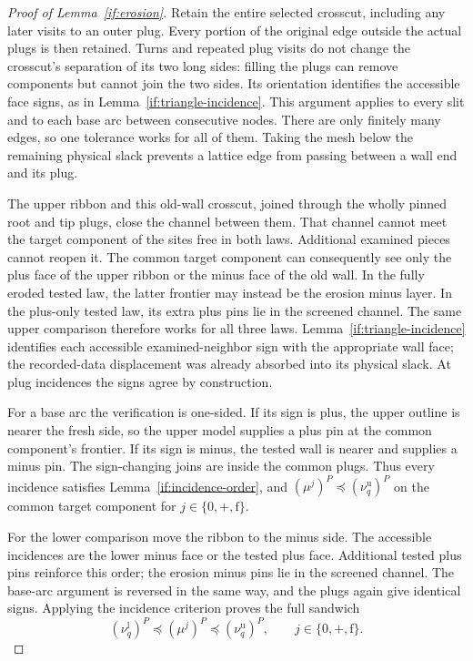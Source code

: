 \documentclass[11pt]{article}
\theoremstyle{definition}
\theoremstyle{remark}
\numberwithin{equation}{section}
\begin{document}
\begin{proof}[Proof of Lemma~\ref{if:erosion}]
Retain the entire selected crosscut, including any later visits to
an outer plug. Every portion of the original edge outside the actual
plugs is then retained. Turns and repeated plug visits do not change
the crosscut's separation of its two long sides: filling the plugs
can remove components but cannot join the two sides. Its orientation
identifies the accessible face signs, as in
Lemma~\ref{if:triangle-incidence}. This argument applies to every
slit and to each base arc between consecutive nodes. There are only
finitely many edges, so one tolerance works for all of them. Taking
the mesh below the remaining physical slack prevents a lattice edge
from passing between a wall end and its plug.

The upper ribbon and this old-wall crosscut, joined through the
wholly pinned root and tip plugs, close the channel between them.
That channel cannot meet the target component of the sites free in
both laws. Additional examined pieces cannot reopen it. The common
target component can consequently see only the plus face of the
upper ribbon or the minus face of the old wall. In the fully eroded
tested law, the latter frontier may instead be the erosion minus
layer. In the plus-only tested law, its extra plus pins lie in the
screened channel. The same upper comparison therefore works for
all three laws. Lemma~\ref{if:triangle-incidence} identifies each
accessible examined-neighbor sign with the appropriate wall face;
the recorded-data displacement was already absorbed into its
physical slack. At plug incidences the signs agree by construction.

For a base arc the verification is one-sided. If its sign is plus,
the upper outline is nearer the fresh side, so the upper model
supplies a plus pin at the common component's frontier. If its sign
is minus, the tested wall is nearer and supplies a minus pin. The
sign-changing joins are inside the common plugs. Thus every
incidence satisfies Lemma~\ref{if:incidence-order}, and
$ (\mu^j)^P\preceq(\nu_q^{\mathrm u})^P$ on the common target
component for $j\in\{0,+,\mathrm f\}$.

For the lower comparison move the ribbon to the minus side. The
accessible incidences are the lower minus face or the tested plus
face. Additional tested plus pins reinforce this order; the erosion
minus pins lie in the screened channel. The base-arc argument is
reversed in the same way, and the plugs again give identical signs.
Applying the incidence criterion proves the full sandwich
\begin{equation}\label{if:plugged-sandwich}
 (\nu_q^{\mathrm l})^P
       \preceq (\mu^j)^P
       \preceq (\nu_q^{\mathrm u})^P,
            \qquad j\in\{0,+,\mathrm f\}.
\end{equation}


\end{proof}
\end{document}
